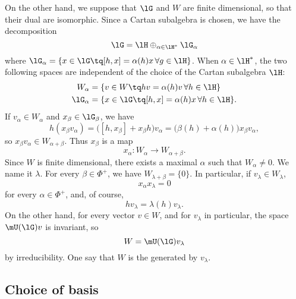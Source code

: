 On the other hand, we suppose that $\lG$ and $W$ are finite dimensional, so that their dual are isomorphic. Since a Cartan subalgebra is chosen, we have the decomposition
\begin{equation}
    \lG=\lH\oplus_{\alpha\in\lH^*}\lG_{\alpha}
\end{equation}
where $\lG_{\alpha}=\{ x\in\lG\tq [h,x]=\alpha(h)x\,\forall g\in\lH \}$. When $\alpha\in\lH^*$, the two following spaces are independent of the choice of the Cartan subalgebra $\lH$:
\begin{equation}
    \begin{aligned}
        W_{\alpha}  &=\{ v\in W \tq hv=\alpha(h)v\,\forall h\in\lH \}\\
        \lG_{\alpha}    &=\{ x\in\lG    \tq [h,x]=\alpha(h)x\,\forall h\in\lH \}.
    \end{aligned}
\end{equation}
If $v_{\alpha}\in W_{\alpha}$ and $x_{\beta}\in\lG_{\beta}$, we have
\begin{equation}
    h(x_{\beta}v_{\alpha})=\big( [h,x_{\beta}]+x_{\beta}h \big)v_{\alpha}=\big( \beta(h)+\alpha(h) \big)x_{\beta} v_{\alpha},
\end{equation}
so $x_{\beta}v_{\alpha}\in W_{\alpha+\beta}$. Thus $x_{\beta}$ is a map
\begin{equation}
    x_{\alpha}\colon W_{\alpha}\to W_{\alpha+\beta}.
\end{equation}
Since $W$ is finite dimensional, there exists a maximal $\alpha$ such that $W_{\alpha}\neq0$. We name it $\lambda$. For every $\beta\in\Phi^+$, we have $W_{\lambda+\beta}=\{ 0 \}$. In particular, if $v_{\lambda}\in W_{\lambda}$,
\begin{equation}
    x_{\alpha}x_{\lambda}=0
\end{equation}
for every $\alpha\in\Phi^+$, and, of course,
\begin{equation}
    hv_{\lambda}=\lambda(h)v_{\lambda}.
\end{equation}
On the other hand, for every vector $v\in W$, and for $v_{\lambda}$ in particular, the space $\mU(\lG)v$ is invariant, so
\begin{equation}
    W=\mU(\lG)v_{\lambda}
\end{equation}
by irreducibility. One say that $W$ is the  generated by $v_{\lambda}$.


                    \subsection{Choice of basis}



